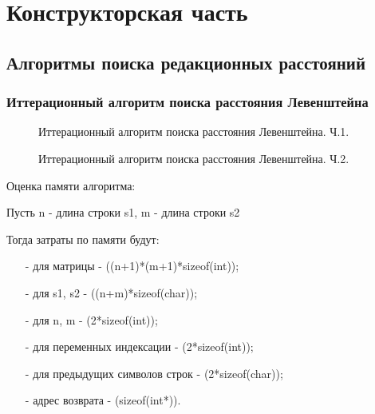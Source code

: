 \section{Конструкторская часть}
\subsection{Алгоритмы поиска редакционных расстояний}
\subsubsection{Иттерационный алгоритм поиска расстояния Левенштейна}
\begin{figure}[!h]
	\centering
	\captionsetup{justification=centering}
    \def\svgscale{0.75}
	
	\caption{Иттерационный алгоритм поиска расстояния Левенштейна. Ч.1.}
	\label{fig:d11}
\end{figure}
\begin{figure}[!h]
	\centering
	\captionsetup{justification=centering}
    \def\svgscale{0.5}
	
	\caption{Иттерационный алгоритм поиска расстояния Левенштейна. Ч.2.}
	\label{fig:d12}
\end{figure}
\pagebreak

Оценка памяти алгоритма:\par
Пусть n - длина строки s1, m - длина строки s2\par
Тогда затраты по памяти будут:\par
\begin{itemize}
	\item[-] для матрицы - ((n+1)*(m+1)*sizeof(int));
	\item[-] для s1, s2 - ((n+m)*sizeof(char));
	\item[-] для n, m - (2*sizeof(int));
	\item[-] для переменных индексации - (2*sizeof(int));
	\item[-] для предыдущих символов строк - (2*sizeof(char));
	\item[-] адрес возврата - (sizeof(int*)).
\end{itemize}
\pagebreak


